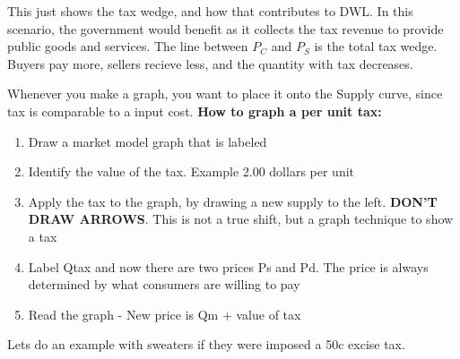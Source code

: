 This just shows the tax wedge, and how that contributes to DWL. In this scenario, the government would benefit as it collects the tax revenue to provide public goods and services. The line between $P_C$ and $P_S$ is the total tax wedge. Buyers pay more, sellers recieve less, and the quantity with tax decreases. 

Whenever you make a graph, you want to place it onto the Supply curve, since tax is comparable to a input cost.
\textbf{How to graph a per unit tax:}
\begin{enumerate}[label=Step \arabic*:]
\item Draw a market model graph that is labeled
\item Identify the value of the tax. Example 2.00 dollars per unit
\item Apply the tax to the graph, by drawing a new supply to the left. \textbf{DON'T DRAW ARROWS}. This is not a true shift, but a graph technique to show a tax 
\item Label Qtax and now there are two prices Ps and Pd. The price is always determined by what consumers are willing to pay
\item Read the graph - New price is Qm + value of tax
\end{enumerate}

Lets do an example with sweaters if they were imposed a 50c excise tax. 

